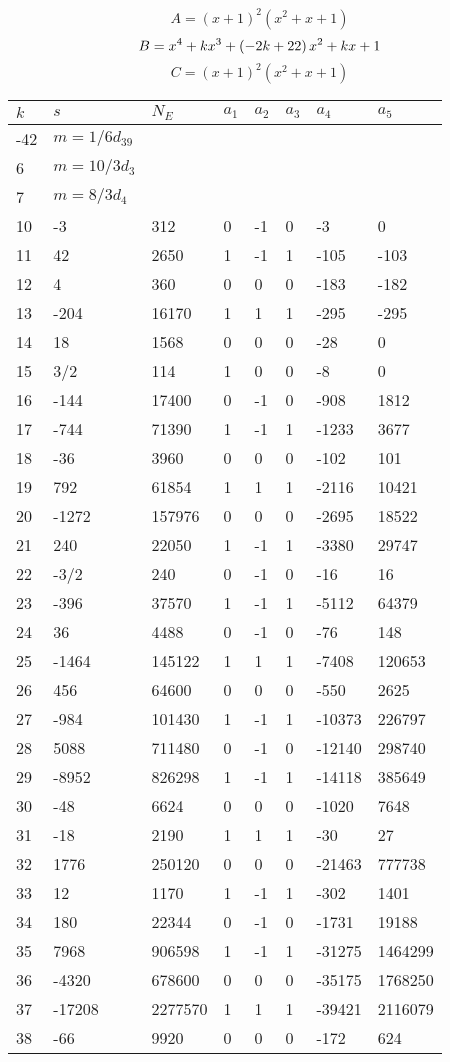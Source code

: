 \documentclass{amsart}
\begin{document}
$$A=(x
 + 1)^{2}(x^2
 + x
 + 1)$$
$$B=x^4
 + k\*x^3
 + \left(-2\*k
 + 22\right) \*x^2
 + k\*x
 + 1$$
$$C=(x
 + 1)^{2}(x^2
 + x
 + 1)$$
\begin{longtable}{|l|l|l|lllll|}
\hline
$k$ & $s$ & $N_E$ & $a_1$ & $a_2$ & $a_3$ & $a_4$ & $a_5$\\
\hline
-42&$m=1/6d_{39}$&&\multicolumn{5}{c|}{}\\
6&$m=10/3d_{3}$&&\multicolumn{5}{c|}{}\\
7&$m=8/3d_{4}$&&\multicolumn{5}{c|}{}\\
10&-3&312&0&-1&0&-3&0\\
11&42&2650&1&-1&1&-105&-103\\
12&4&360&0&0&0&-183&-182\\
13&-204&16170&1&1&1&-295&-295\\
14&18&1568&0&0&0&-28&0\\
15&3/2&114&1&0&0&-8&0\\
16&-144&17400&0&-1&0&-908&1812\\
17&-744&71390&1&-1&1&-1233&3677\\
18&-36&3960&0&0&0&-102&101\\
19&792&61854&1&1&1&-2116&10421\\
20&-1272&157976&0&0&0&-2695&18522\\
21&240&22050&1&-1&1&-3380&29747\\
22&-3/2&240&0&-1&0&-16&16\\
23&-396&37570&1&-1&1&-5112&64379\\
24&36&4488&0&-1&0&-76&148\\
25&-1464&145122&1&1&1&-7408&120653\\
26&456&64600&0&0&0&-550&2625\\
27&-984&101430&1&-1&1&-10373&226797\\
28&5088&711480&0&-1&0&-12140&298740\\
29&-8952&826298&1&-1&1&-14118&385649\\
30&-48&6624&0&0&0&-1020&7648\\
31&-18&2190&1&1&1&-30&27\\
32&1776&250120&0&0&0&-21463&777738\\
33&12&1170&1&-1&1&-302&1401\\
34&180&22344&0&-1&0&-1731&19188\\
35&7968&906598&1&-1&1&-31275&1464299\\
36&-4320&678600&0&0&0&-35175&1768250\\
37&-17208&2277570&1&1&1&-39421&2116079\\
38&-66&9920&0&0&0&-172&624\\

\end{longtable}
\end{document}
